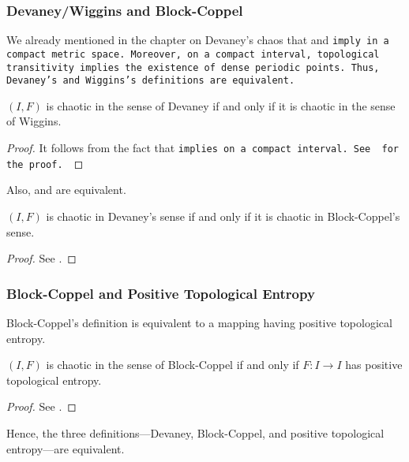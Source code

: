 \documentclass[12pt,twoside,draft]{book}
\begin{document}
\subsubsection*{Devaney/Wiggins and Block-Coppel}
We already mentioned in the chapter on Devaney's chaos that \dpp and \tt imply \sdic in a compact metric space.
Moreover, on a compact interval, topological transitivity implies the existence of dense periodic points.
Thus, Devaney's and Wiggins's definitions are equivalent.
\begin{theorem}
  $(I,F)$ is chaotic in the sense of Devaney if and only if it is chaotic in the sense of Wiggins.
  \label{thm:devaney-wiggins}
  \begin{proof}
    It follows from the fact that \tt implies \dpp on a compact interval.
    See \citet{silverman} for the proof.
  \end{proof}
\end{theorem}
Also, \dev and \blcp are equivalent.
\begin{theorem}
  $(I,F)$ is chaotic in Devaney's sense if and only if it is chaotic in Block-Coppel's sense.
  \begin{proof}
    See \citet{aulbach}.
  \end{proof}
  \label{thm:devaney-blockcoppel}
\end{theorem}

\subsubsection*{Block-Coppel and Positive Topological Entropy}
Block-Coppel's definition is equivalent to a mapping having positive topological entropy.
\begin{theorem}
  $(I,F)$ is chaotic in the sense of Block-Coppel if and only if $F: I \to I$ has positive topological entropy.
  \label{thm:entropy-blockcoppel}
  \begin{proof}
    See \citet[VII, Theorem 24]{blockcoppel}.
  \end{proof}
\end{theorem}
Hence, the three definitions---Devaney, Block-Coppel, and positive topological entropy---are equivalent.
\end{document}
